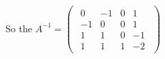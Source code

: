 \singlespacing

So the $A^{-1} = \begin{pmatrix}
        \begin{array}{cccc}
            0  & -1 & 0 & 1  \\
            -1 & 0  & 0 & 1  \\
            1  & 1  & 0 & -1 \\
            1  & 1  & 1 & -2
        \end{array}
    \end{pmatrix}$